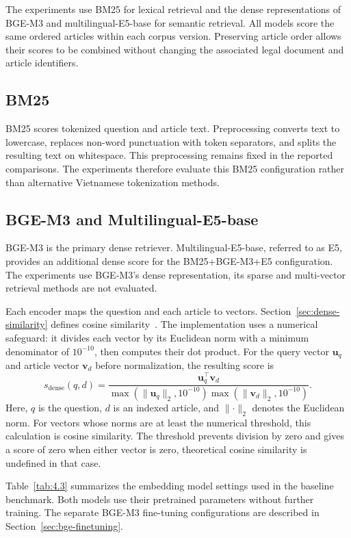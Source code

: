 The experiments use BM25 for lexical retrieval and the dense representations of BGE-M3 and multilingual-E5-base for semantic retrieval. All models score the same ordered articles within each corpus version. Preserving article order allows their scores to be combined without changing the associated legal document and article identifiers.

\subsection{BM25}

BM25 scores tokenized question and article text. Preprocessing converts text to lowercase, replaces non-word punctuation with token separators, and splits the resulting text on whitespace. This preprocessing remains fixed in the reported comparisons. The experiments therefore evaluate this BM25 configuration rather than alternative Vietnamese tokenization methods.

\subsection{BGE-M3 and Multilingual-E5-base}

BGE-M3 is the primary dense retriever. Multilingual-E5-base, referred to as E5, provides an additional dense score for the BM25+BGE-M3+E5 configuration. The experiments use BGE-M3's dense representation, its sparse and multi-vector retrieval methods are not evaluated.

Each encoder maps the question and each article to vectors. Section~\ref{sec:dense-similarity} defines cosine similarity~\cite{manning2008}. The implementation uses a numerical safeguard: it divides each vector by its Euclidean norm with a minimum denominator of \(10^{-10}\), then computes their dot product. For the query vector \(\mathbf{u}_q\) and article vector \(\mathbf{v}_d\) before normalization, the resulting score is
\[
s_{\mathrm{dense}}(q,d)=\frac{\mathbf{u}_q^\top\mathbf{v}_d}{\max(\lVert\mathbf{u}_q\rVert_2,10^{-10})\max(\lVert\mathbf{v}_d\rVert_2,10^{-10})}.
\]
Here, \(q\) is the question, \(d\) is an indexed article, and \(\lVert\cdot\rVert_2\) denotes the Euclidean norm. For vectors whose norms are at least the numerical threshold, this calculation is cosine similarity. The threshold prevents division by zero and gives a score of zero when either vector is zero, theoretical cosine similarity is undefined in that case.

Table~\ref{tab:4.3} summarizes the embedding model settings used in the baseline benchmark. Both models use their pretrained parameters without further training. The separate BGE-M3 fine-tuning configurations are described in Section~\ref{sec:bge-finetuning}.


